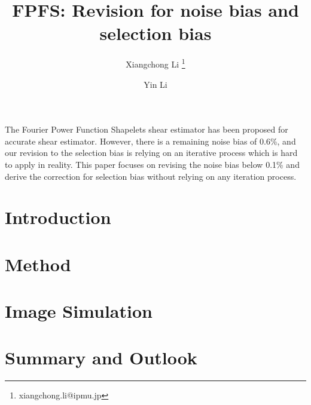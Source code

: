 \documentclass{aa}
\begin{document}
\title{FPFS: Revision for noise bias and selection bias}
\author{Xiangchong Li   \thanks{xiangchong.li@ipmu.jp}
\and Yin Li }

\abstract
{}
{
The Fourier Power Function Shapelets shear estimator has been proposed for
accurate shear estimator. However, there is a remaining noise bias of 0.6\%,
and our revision to the selection bias is relying on an iterative process which
is hard to apply in reality.
This paper focuses on revising the noise bias below 0.1\% and derive the
correction for selection bias
without relying on any iteration process.
}
{

}
{

}
{

}

\maketitle

\section{Introduction}
\label{sec:Intro}


\section{Method}
\label{sec:Method}


\section{Image Simulation}
\label{sec:sim}


\section{Summary and Outlook}
\label{sec:Summary}

\begin{acknowledgements}

\end{acknowledgements}



\end{document}
